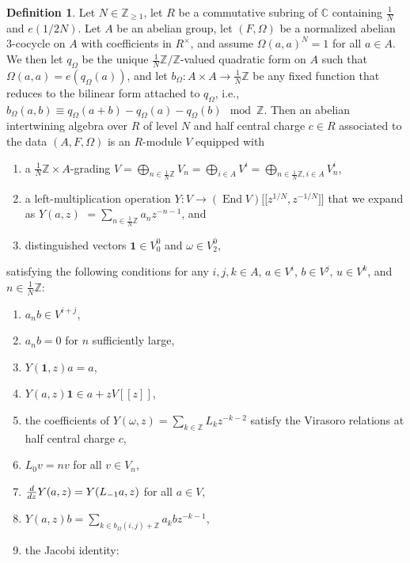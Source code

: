 \documentclass[11pt]{article}
\newcommand{\bC}{\mathbb{C}}
\newcommand{\bZ}{\mathbb{Z}}
\newcommand{\unit}{\mathbf{1}}
\DeclareMathOperator{\End}{End}
\theoremstyle{definition}
\newtheorem{defn}[thm]{Definition}
\begin{document}
\begin{defn}
Let $N \in \bZ_{\geq 1}$, let $R$ be a commutative subring of $\bC$ containing $\frac{1}{N}$ and $e(1/2N)$. Let $A$ be an abelian group, let $(F,\Omega)$ be a normalized abelian 3-cocycle on $A$ with coefficients in $R^\times$, and assume $\Omega(a,a)^N = 1$ for all $a \in A$. We then let $q_\Omega$ be the unique $\frac{1}{N}\bZ/\bZ$-valued quadratic form on $A$ such that $\Omega(a,a) = e(q_\Omega(a))$, and let $b_\Omega\colon A \times A \to \frac{1}{N}\bZ$ be any fixed function that reduces to the bilinear form attached to $q_\Omega$, i.e., $b_\Omega(a,b) \equiv q_\Omega(a+b) - q_\Omega(a) - q_\Omega(b) \mod \bZ$. Then an abelian intertwining algebra over $R$ of level $N$ and half central charge $c \in R$ associated to the data $(A, F, \Omega)$ is an $R$-module $V$ equipped with
\begin{enumerate}\itemsep=0pt
\item[1)] a $\frac{1}{N}\bZ \times A$-grading $V = \bigoplus_{n \in \frac{1}{N} \bZ} V_n = \bigoplus_{i \in A} V^i = \bigoplus_{n \in \frac{1}{N} \bZ, i \in A} V_n^i$,
\item[2)] a left-multiplication operation $Y\colon V \to (\End V)\big[\big[z^{1/N},z^{-1/N}\big]\big]$ that we expand as $Y(a,z)$ $= \sum\limits_{n \in \frac{1}{N}\bZ} a_n z^{-n-1}$, and
\item[3)] distinguished vectors $\unit \in V_0^0$ and $\omega \in V_2^0$,
\end{enumerate}
satisfying the following conditions for any $i,j,k \in A$, $a \in V^i$, $b \in V^j$, $u \in V^k$, and $n \in \frac{1}{N}\bZ$:
\begin{enumerate}\itemsep=0pt
\item[1)] $a_n b \in V^{i+j}$,
\item[2)] $a_n b = 0$ for $n$ sufficiently large,
\item[3)] $Y(\unit, z)a = a$,
\item[4)] $Y(a,z)\unit \in a + zV[[z]]$,
\item[5)] the coefficients of $Y(\omega,z) = \sum\limits_{k \in \bZ} L_k z^{-k-2}$ satisfy the Virasoro relations at half central charge $c$,
\item[6)] $L_0 v = nv$ for all $v \in V_n$,
\item[7)] $\frac{{\rm d}}{{\rm d}z} Y(a,z) = Y(L_{-1}a,z)$ for all $a \in V$,
\item[8)] $Y(a,z)b = \sum\limits_{k \in b_\Omega(i,j) + \bZ} a_k b z^{-k-1}$,
\item[9)] the Jacobi identity:

\end{enumerate}
\end{defn}
\end{document}
